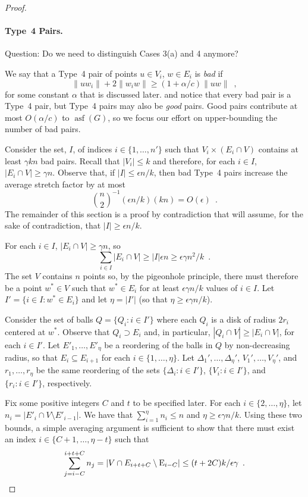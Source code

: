 \documentclass{patmorin}
\DeclareMathOperator{\asf}{asf}
\begin{document}
\begin{proof}
  \paragraph{Type~4 Pairs.}  
  Question: Do we need to distinguish Cases 3(a) and 4 anymore?
  
  We say that a Type~4 pair of points $u\in V_i$, $w\in E_i$ is
  \emph{bad} if
  \[
      \|uw_i\|+2\|w_iw\| \ge (1+\alpha/c)\|uw\| \enspace ,
  \]
  for some constant $\alpha$ that is discussed later.  and notice that
  every bad pair is a Type~4 pair, but Type~4 pairs may also
  be \emph{good} pairs.  Good pairs contribute at most $O(\alpha/c)$
  to $\asf(G)$, so we focus our effort on upper-bounding the number of
  bad pairs.

  Consider the set, $I$, of indices $i\in\{1,\ldots,n'\}$ such that
  $V_i\times (E_i\cap V)$ contains at least $\gamma kn$ bad pairs.
  Recall that $|V_i|\le k$ and therefore, for each $i\in I$, $|E_i\cap
  V|\ge \gamma n$.  Observe that, if $|I|\le \epsilon n/k$, then bad
  Type~4 pairs increase the average stretch factor by at most
  \[
     \binom{n}{2}^{-1} (\epsilon n/k)(kn)  = O(\epsilon) \enspace .
  \]
  The remainder of this section is a proof by contradiction that will
  assume, for the sake of contradiction, that $|I|\ge \epsilon n/k$.

  For each $i\in I$, $|E_i\cap V|\ge \gamma n$, so
  \[
    \sum_{i\in I}|E_i\cap V|\ge|I|\epsilon n\ge \epsilon\gamma n^2/k \enspace .
  \]
  The set $V$ contains $n$ points so, by the pigeonhole principle, there
  must therefore be a point $w^*\in V$ such that $w^*\in E_i$ for at least
  $\epsilon\gamma n/k$ values of $i\in I$.  Let $I'=\{i\in I: w^*\in E_i\}$
  and let $\eta=|I'|$ (so that $\eta\ge \epsilon\gamma n/k$).

  Consider the set of balls $Q=\{ Q_{i}:i\in I'\}$ where each $Q_i$ is a
  disk of radius $2r_i$ centered at $w^*$.  Observe that $Q_i\supset E_i$
  and, in particular, $|Q_i\cap V|\ge |E_i\cap V|$, for each $i\in I'$.
  Let $E'_1,\ldots,E'_{\eta}$ be a reordering of the balls in $Q$
  by non-decreasing radius, so that $E_{i}\subseteq E_{i+1}$ for
  each $i\in\{1,\ldots,\eta\}$. Let $\Delta_1',\ldots,\Delta_{\eta}'$,
  $V_1',\ldots,V_{\eta}'$, and $r_1,\ldots,r_{\eta}$ be the same
  reordering of the sets $\{\Delta_i:i\in I'\}$, $\{V_i:i\in I'\}$,
  and $\{r_i:i\in I'\}$, respectively.

  Fix some positive integers $C$ and $t$ to be specified later.  For each
  $i\in\{2,\ldots,\eta\}$, let $n_i=|E'_i\cap V\setminus E'_{i-1}|$. We
  have that $\sum_{i=1}^{\eta} n_i \le n$ and $\eta\ge \epsilon\gamma n/k$.
  Using these two bounds, a simple averaging argument is sufficient
  to show that there must exist an index $i\in\{C+1,\ldots,\eta-t\}$
  such that
  \begin{equation}
     \sum_{j=i-C}^{i+t+C} n_j 
        = |V\cap E_{i+t+C}\setminus \E_{i-C}| 
          \le (t+2C)k/\epsilon\gamma \enspace . \eqlabel{sparse}
  \end{equation}


\end{proof}
\end{document}
